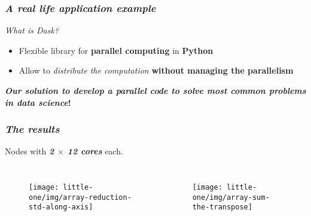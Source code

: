 \begin{frame}
  \frametitle{ \textit{A real life application
      example}}
  \begin{block}{ \textit{What is Dask?}}
    \begin{itemize}
      \itemsep0em
      \item Flexible library for \alert{\textbf{parallel computing}} in \alert{\textbf{Python}}
      \item Allow to \textit{distribute the computation} \textbf{without
          managing the parallelism}
    \end{itemize}
    \pause
  \end{block}
  \pause
  \vfill
  {
    \large
    \centering
     \textbf{\textit{Our solution to develop a parallel code
        to solve \alert{most common problems} in \alert{data science}}!}
  }
\end{frame}

\begin{frame}
  \frametitle{ \textit{The results}}
  {
    \scriptsize
     Nodes with \textit{\textbf{2 $\times$
        12 cores}} each.
  }
  \begin{columns}
    \begin{figure}
      \centering
      \texttt{[image: little-one/img/array-reduction-std-along-axis]}
    \end{figure}
    \begin{figure}
      \centering
      \texttt{[image: little-one/img/array-sum-the-transpose]}
    \end{figure}
  \end{columns}
\end{frame}
